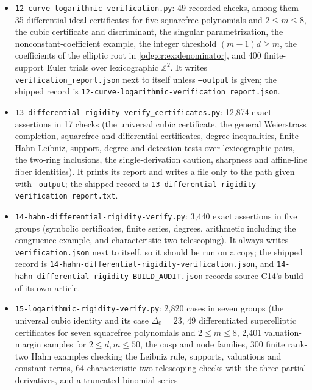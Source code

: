 \documentclass[11pt,oneside]{article}
\numberwithin{equation}{section}
\theoremstyle{definition}
\theoremstyle{remark}
\newcommand{\Z}{\mathbb Z}
\newcommand{\fn}[1]{\nolinkurl{#1}}
\begin{document}
\begin{itemize}[leftmargin=*]
Frobenius squares, the discretely ordered ring's parity and leading terms, binomial
coefficients, the dual-number example). It writes \fn{verification.json} next to itself
unless \texttt{--output} is given, and prints the report; the shipped record is
\fn{11-curve-abelian-rigidity-verification.json}.
\item \fn{12-curve-logarithmic-verification.py}: 49 recorded checks, among them 35
differential-ideal certificates for five squarefree polynomials and $2\le m\le8$, the
cubic certificate and discriminant, the singular parametrization, the
nonconstant-coefficient example, the integer threshold $(m-1)d\ge m$, the coefficients of
the elliptic root in \cref{odg:cr:ex:denominator}, and 400 finite-support Euler trials
over lexicographic $\Z^2$. It writes \fn{verification_report.json} next to itself unless
\texttt{--output} is given; the shipped record is
\fn{12-curve-logarithmic-verification_report.json}.
\item \fn{13-differential-rigidity-verify_certificates.py}: 12,874 exact assertions in
17 checks (the universal cubic certificate, the general Weierstrass completion,
squarefree and differential certificates, degree inequalities, finite Hahn Leibniz,
support, degree and detection tests over lexicographic pairs, the two-ring inclusions,
the single-derivation caution, sharpness and affine-line fiber identities). It prints
its report and writes a file only to the path given with \texttt{--output}; the shipped
record is \fn{13-differential-rigidity-verification_report.txt}.
\item \fn{14-hahn-differential-rigidity-verify.py}: 3,440 exact assertions in five
groups (symbolic certificates, finite series, degrees, arithmetic including the
congruence example, and characteristic-two telescoping). It always writes
\fn{verification.json} next to itself, so it should be run on a copy; the shipped
record is \fn{14-hahn-differential-rigidity-verification.json}, and
\fn{14-hahn-differential-rigidity-BUILD_AUDIT.json} records source C14's build of its
own article.
\item \fn{15-logarithmic-rigidity-verify.py}: 2,820 cases in seven groups (the universal
cubic identity and its case $\Delta_0=23$, 49 differentiated superelliptic certificates
for seven squarefree polynomials and $2\le m\le8$, 2,401 valuation-margin samples for
$2\le d,m\le50$, the cusp and node families, 300 finite rank-two Hahn examples checking
the Leibniz rule, supports, valuations and constant terms, 64 characteristic-two
telescoping checks with the three partial derivatives, and a truncated binomial series

\end{itemize}
\end{document}
